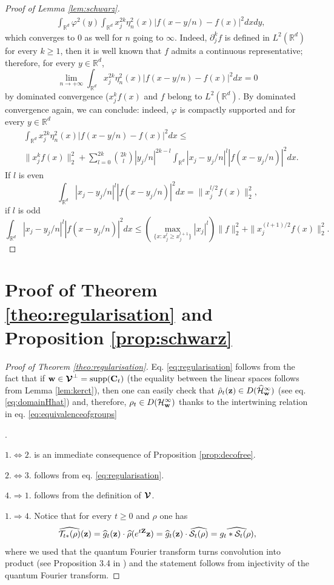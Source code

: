 \documentclass[preprint]{elsarticle}
\theoremstyle{definition}
\def\RR{\mathbb{R}}
\def\TT{\mathcal{T}}
\begin{document}
\begin{proof}[Proof of Lemma \ref{lem:schwarz}]
\[\begin{split}
    &\int_{\RR^d}\varphi^2(y) \int_{\RR^d}x_j^{2k}\eta^2_n(x)|f(x-y/n)-f(x)|^2dxdy,
\end{split}\]
which converges to $0$ as well for $n$ going to $\infty$. Indeed, $\partial_j^k f$ is defined in $L^2(\RR^d)$ for every $k \geq 1$, then it is well known that $f$ admits a continuous representative; therefore, for every $y \in \RR^d$,
$$\lim_{n \rightarrow +\infty}\int_{\RR^d}x_j^{2k}\eta^2_n(x)|f(x-y/n)-f(x)|^2dx=0$$
by dominated convergence ($x_j^kf(x)$ and $f$ belong to $L^2(\RR^d)$. By dominated convergence again, we can conclude: indeed, $\varphi$ is compactly supported and for every $y \in \RR^d$
\[\begin{split}
    &\int_{\RR^d}x_j^{2k}\eta^2_n(x)|f(x-y/n)-f(x)|^2dx \leq  \\
    &\|x_j^k f(x)\|^2_2+\sum_{l=0}^{2k}\binom{2k}{l}|y_j/n|^{2k-l}\int_{\RR^d}|x_j-y_j/n|^{l}|f(x-y_j/n)|^2dx.
\end{split}\]
If $l$ is even
$$\int_{\RR^d}|x_j-y_j/n|^{l}|f(x-y_j/n)|^2dx=\|x_j^{l/2}f(x)\|_2^2,$$
if $l$ is odd
$$\int_{\RR^d}|x_j-y_j/n|^{l}|f(x-y_j/n)|^2dx \leq \left (\max_{\{x:x_j^{l}\geq x_j^{l+1}\}}|x_j|^{l}\right )\|f\|_2^2+\|x_j^{(l+1)/2}f(x)\|_2^2.$$
\end{proof}

\section{Proof of Theorem \ref{theo:regularisation} and Proposition \ref{prop:schwarz}} \label{app:schwarzII}

\begin{proof}[Proof of Theorem \ref{theo:regularisation}]
    Eq. \eqref{eq:regularisation} follows from the fact that if $\mathbf{w} \in \boldsymbol{\cal V}^\perp={\rm supp}(\mathbf{C}_t)$ (the equality between the linear spaces follows from Lemma \ref{lem:kerct}), then one can easily check that $\hat{\rho}_t(\mathbf{z})\in D(\widehat{{\cal H}}_{\mathbf{w}}^\infty)$ (see eq. \eqref{eq:domainHhat}) and, therefore, $\rho_t \in D({\cal H}_{\mathbf{w}}^\infty)$ thanks to the intertwining relation in eq. \eqref{eq:equivalenceofgroups}
    
    
    
    .

    \bigskip $1. \Leftrightarrow2.$ is an immediate consequence of Proposition \ref{prop:decofree}.

    \bigskip $2. \Leftrightarrow 3.$ follows from eq. \eqref{eq:regularisation}.

    \bigskip $4. \Rightarrow 1.$ follows from the definition of $\boldsymbol{{\cal V}}$.

    \bigskip $1. \Rightarrow 4.$ Notice that for every $t \geq 0$ and $\rho$ one has
$$\widehat{\TT_{t*}(\rho)}(\mathbf{z})=\widehat{g}_t(\mathbf{z})\cdot \widehat{\rho}(e^{t\mathbf{Z}}\mathbf{z})=\widehat{g}_t(\mathbf{z})\cdot \widehat{{\cal S}_t(\rho)}=\widehat{g_t*{\cal S}_t(\rho)},$$
where we used that the quantum Fourier transform turns convolution into product (see Proposition 3.4 in \cite{We84}) and the statement follows from injectivity of the quantum Fourier transform.
\end{proof}
\end{document}
